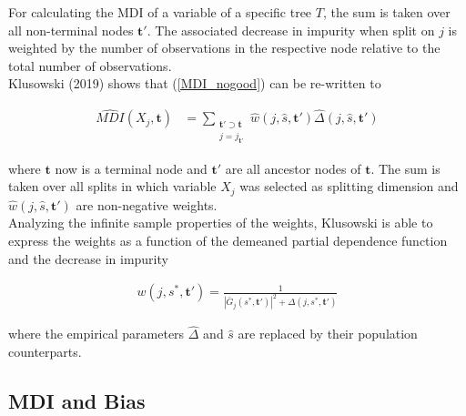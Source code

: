 For calculating the MDI of a variable of a specific tree $T$, the sum is taken over all non-terminal nodes $\mathbf{t'}$. 
The associated decrease in impurity when split on $j$ is weighted by the number of observations in the respective node relative to the total number of observations. \\

Klusowski (2019) shows that (\ref{MDI_nogood}) can be re-written to 

\begin{align}
    \widehat{MDI}(X_j, \mathbf{t}) &= \sum_{\substack{\mathbf{t'} \supset \mathbf{t} \\ j = j_{\mathbf{t'}}}} \hat{w}(j, \hat{s}, \mathbf{t'}) \hat{\Delta}(j, \hat{s}, \mathbf{t'}) \label{MDI}
\end{align}

where $\mathbf{t}$ now is a terminal node and $\mathbf{t'}$ are all ancestor nodes of $\mathbf{t}$. 
The sum is taken over all splits in which variable $X_j$ was selected as splitting dimension and $\hat{w}(j, \hat{s}, \mathbf{t'})$ are non-negative weights. \\
Analyzing the infinite sample properties of the weights, Klusowski is able to express the weights as a function of the demeaned partial dependence function and the decrease in impurity

\begin{align}
    w(j, s^*, \mathbf{t'}) = \frac{1}{|\bar{G}_j(s^*, \mathbf{t'})|^2 + \Delta(j, s^*, \mathbf{t'})} \label{weight}
\end{align}

where the empirical parameters $\hat{\Delta}$ and $\hat{s}$ are replaced by their population counterparts.

\subsection{MDI and Bias}

